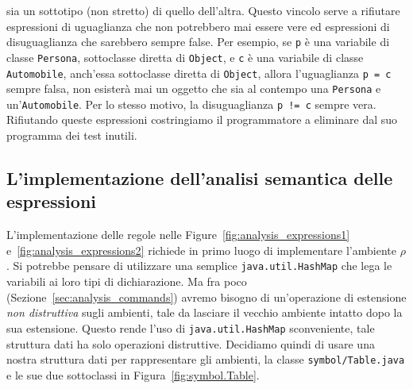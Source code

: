 \begin{description}
  sia un sottotipo (non stretto) di quello dell'altra.
  Questo vincolo serve a rifiutare espressioni di uguaglianza
  che non potrebbero mai essere vere ed espressioni di disuguaglianza che
  sarebbero sempre false. Per esempio, se \texttt{p} \`e una variabile di
  classe \texttt{Persona}, sottoclasse diretta di \texttt{Object}, e
  \texttt{c} \`e una variabile di classe
  \texttt{Automobile}, anch'essa sottoclasse diretta di
  \texttt{Object}, allora l'uguaglianza \texttt{p = c} \e sempre falsa,
  \poiche non esister\`a mai un oggetto che sia al contempo
  una \texttt{Persona} e un'\texttt{Automobile}. Per lo stesso motivo,
  la disuguaglianza \texttt{p != c} \e sempre vera. Rifiutando queste
  espressioni costringiamo il programmatore a eliminare dal suo programma
  dei test inutili.
\end{description}
%
\subsection{L'implementazione dell'analisi semantica delle espressioni}
  \label{subsec:analysis_expressions_implementation}
%
L'implementazione delle regole nelle Figure~\ref{fig:analysis_expressions1}
e~\ref{fig:analysis_expressions2}
richiede in primo luogo di implementare l'ambiente $\rho$. Si potrebbe
pensare di utilizzare una semplice \texttt{java.util.HashMap} che lega
le variabili ai loro tipi di dichiarazione. Ma fra poco
(Sezione~\ref{sec:analysis_commands}) avremo bisogno di
un'operazione di estensione \emph{non distruttiva} sugli ambienti, tale
\cioe da lasciare il vecchio ambiente intatto dopo la sua estensione.
Questo rende l'uso di \texttt{java.util.HashMap} sconveniente, \poiche
tale struttura dati ha solo operazioni distruttive.
Decidiamo quindi di usare una nostra struttura dati
per rappresentare gli ambienti, \cioe la classe \texttt{symbol/Table.java}
e le sue due sottoclassi in Figura~\ref{fig:symbol.Table}.
%
